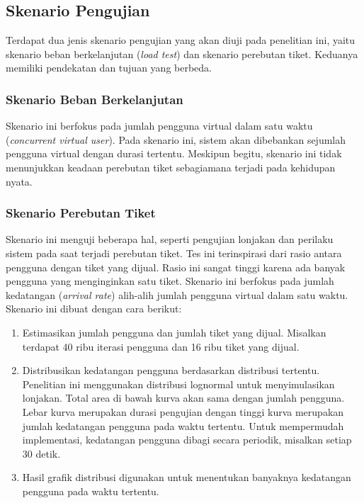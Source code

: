 \subsection{Skenario Pengujian}

Terdapat dua jenis skenario pengujian yang akan diuji pada penelitian ini, yaitu skenario beban berkelanjutan (\textit{load test}) dan skenario perebutan tiket. Keduanya memiliki pendekatan dan tujuan yang berbeda.

\subsubsection{Skenario Beban Berkelanjutan}

Skenario ini berfokus pada jumlah pengguna virtual dalam satu waktu (\textit{concurrent virtual user}). Pada skenario ini, sistem akan dibebankan sejumlah pengguna virtual dengan durasi tertentu. Meskipun begitu, skenario ini tidak menunjukkan keadaan perebutan tiket sebagiamana terjadi pada kehidupan nyata.

\subsubsection{Skenario Perebutan Tiket}

Skenario ini menguji beberapa hal, seperti pengujian lonjakan dan perilaku sistem pada saat terjadi perebutan tiket. Tes ini terinspirasi dari rasio antara pengguna dengan tiket yang dijual. Rasio ini sangat tinggi karena ada banyak pengguna yang menginginkan satu tiket. Skenario ini berfokus pada jumlah kedatangan (\textit{arrival rate}) alih-alih jumlah pengguna virtual dalam satu waktu. Skenario ini dibuat dengan cara berikut:

\begin{enumerate}
    \item Estimasikan jumlah pengguna dan jumlah tiket yang dijual. Misalkan terdapat 40 ribu iterasi pengguna dan 16 ribu tiket yang dijual.
    \item Distribusikan kedatangan pengguna berdasarkan distribusi tertentu. Penelitian ini menggunakan distribusi lognormal untuk menyimulasikan lonjakan. Total area di bawah kurva akan sama dengan jumlah pengguna. Lebar kurva merupakan durasi pengujian dengan tinggi kurva merupakan jumlah kedatangan pengguna pada waktu tertentu. Untuk mempermudah implementasi, kedatangan pengguna dibagi secara periodik, misalkan setiap 30 detik.
    \item Hasil grafik distribusi digunakan untuk menentukan banyaknya kedatangan pengguna pada waktu tertentu.
\end{enumerate}
